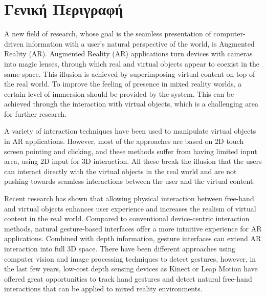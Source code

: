 

 \label{c:intro}


\section{Γενική Περιγραφή}



A new field of research, whose goal is the seamless presentation of computer-driven information with a user’s natural perspective of the world, is Augmented Reality (AR). 
Augmented Reality (AR) applications turn devices with cameras into magic lenses, through which real and virtual objects appear to coexist in the same space.  This illusion is achieved by superimposing virtual content on top of the real world. To improve the feeling of presence in mixed reality worlds, a certain level of immersion should be provided by the system. This can be achieved through the interaction with virtual objects, which is a challenging area for further research. 

A variety of interaction techniques have been used to manipulate virtual objects in AR applications. However, most of the approaches are based on 2D touch screen pointing and clicking, and these methods suffer from having limited input area, using 2D input for 3D interaction. All these break the illusion that the users can interact directly with the virtual objects in the real world and are not pushing towards seamless interactions between the user and the virtual content.

Recent research has shown that allowing physical interaction between free-hand and virtual objects enhances user experience and increases the realism of virtual content in the real world. Compared to conventional device-centric interaction methods, natural gesture-based interfaces offer a more intuitive experience for AR applications. Combined with depth information, gesture interfaces can extend AR interaction into full 3D space. There have been different approaches using computer vision and image processing techniques to detect gestures, however, in the last few years, low-cost depth sensing devices as Kinect or Leap Motion have offered great opportunities to track hand gestures and detect natural free-hand interactions that can be applied to mixed reality environments.

